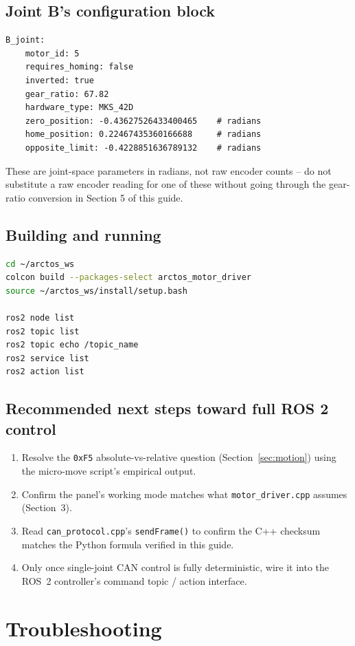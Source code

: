 \documentclass[11pt,letterpaper]{article}
\begin{document}
\subsection{Joint B's configuration block}
\begin{lstlisting}
B_joint:
    motor_id: 5
    requires_homing: false
    inverted: true
    gear_ratio: 67.82
    hardware_type: MKS_42D
    zero_position: -0.43627526433400465    # radians
    home_position: 0.22467435360166688     # radians
    opposite_limit: -0.4228851636789132    # radians
\end{lstlisting}
These are joint-space parameters in radians, not raw encoder counts -- do not substitute a raw encoder reading for one of these without going through the gear-ratio conversion in Section 5 of this guide.

\subsection{Building and running}
\begin{lstlisting}[language=bash]
cd ~/arctos_ws
colcon build --packages-select arctos_motor_driver
source ~/arctos_ws/install/setup.bash

ros2 node list
ros2 topic list
ros2 topic echo /topic_name
ros2 service list
ros2 action list
\end{lstlisting}

\subsection{Recommended next steps toward full ROS 2 control}
\begin{enumerate}
    \item Resolve the \texttt{0xF5} absolute-vs-relative question (Section~\ref{sec:motion}) using the micro-move script's empirical output.
    \item Confirm the panel's working mode matches what \texttt{motor\_driver.cpp} assumes (Section~3).
    \item Read \texttt{can\_protocol.cpp}'s \texttt{sendFrame()} to confirm the C++ checksum matches the Python formula verified in this guide.
    \item Only once single-joint CAN control is fully deterministic, wire it into the ROS~2 controller's command topic / action interface.
\end{enumerate}

\newpage
\section{Troubleshooting}
\label{sec:troubleshooting}
\end{document}
